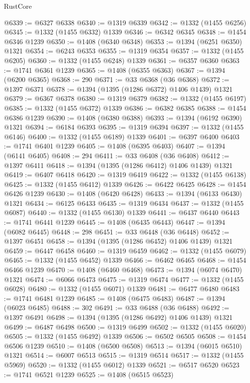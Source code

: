 \begin{lexlean}{RustCore}
\begin{coremodule}
@6339 := @6327 @6338
@6340 := @1319 @6339
@6342 := @1332 (@1455 @6256)
@6345 := @1332 (@1455 @6332) @1339
@6346 := @6342 @6345
@6348 := @1454 @6346 @1239
@6350 := @1408 (@6340 @6348)
@6353 := @1394 (@6251 @6350) @1321
@6354 := @6243 @6353
@6355 := @1319 @6354
@6357 := @1332 (@1455 @6205)
@6360 := @1332 (@1455 @6248) @1339
@6361 := @6357 @6360
@6363 := @1741 @6361 @1239
@6365 := @1408 (@6355 @6363)
@6367 := @1394 (@6200 @6365)
@6368 := 290
@6371 := @33 @6368 (@36 @6368)
@6372 := @1397 @6371
@6378 := @1394 (@1395 (@1286 @6372) @1406 @1439) @1321
@6379 := @6367 @6378
@6380 := @1319 @6379
@6382 := @1332 (@1455 @6197)
@6385 := @1332 (@1455 @6372) @1339
@6386 := @6382 @6385
@6388 := @1454 @6386 @1239
@6390 := @1408 (@6380 @6388)
@6393 := @1394 (@6192 @6390) @1321
@6394 := @6184 @6393
@6395 := @1319 @6394
@6397 := @1332 (@1455 @6146)
@6400 := @1332 (@1455 @6189) @1339
@6401 := @6397 @6400
@6403 := @1741 @6401 @1239
@6405 := @1408 (@6395 @6403)
@6407 := @1394 (@6141 @6405)
@6408 := 294
@6411 := @33 @6408 (@36 @6408)
@6412 := @1397 @6411
@6418 := @1394 (@1395 (@1286 @6412) @1406 @1439) @1321
@6419 := @6407 @6418
@6420 := @1319 @6419
@6422 := @1332 (@1455 @6138)
@6425 := @1332 (@1455 @6412) @1339
@6426 := @6422 @6425
@6428 := @1454 @6426 @1239
@6430 := @1408 (@6420 @6428)
@6433 := @1394 (@6133 @6430) @1321
@6434 := @6125 @6433
@6435 := @1319 @6434
@6437 := @1332 (@1455 @6087)
@6440 := @1332 (@1455 @6130) @1339
@6441 := @6437 @6440
@6443 := @1741 @6441 @1239
@6445 := @1408 (@6435 @6443)
@6447 := @1394 (@6082 @6445)
@6448 := 298
@6451 := @33 @6448 (@36 @6448)
@6452 := @1397 @6451
@6458 := @1394 (@1395 (@1286 @6452) @1406 @1439) @1321
@6459 := @6447 @6458
@6460 := @1319 @6459
@6462 := @1332 (@1455 @6079)
@6465 := @1332 (@1455 @6452) @1339
@6466 := @6462 @6465
@6468 := @1454 @6466 @1239
@6470 := @1408 (@6460 @6468)
@6473 := @1394 (@6074 @6470) @1321
@6474 := @6066 @6473
@6475 := @1319 @6474
@6477 := @1332 (@1455 @6028)
@6480 := @1332 (@1455 @6071) @1339
@6481 := @6477 @6480
@6483 := @1741 @6481 @1239
@6485 := @1408 (@6475 @6483)
@6487 := @1394 (@6023 @6485)
@6488 := 302
@6491 := @33 @6488 (@36 @6488)
@6492 := @1397 @6491
@6498 := @1394 (@1395 (@1286 @6492) @1406 @1439) @1321
@6499 := @6487 @6498
@6500 := @1319 @6499
@6502 := @1332 (@1455 @6020)
@6505 := @1332 (@1455 @6492) @1339
@6506 := @6502 @6505
@6508 := @1454 @6506 @1239
@6510 := @1408 (@6500 @6508)
@6513 := @1394 (@6015 @6510) @1321
@6514 := @6007 @6513
@6515 := @1319 @6514
@6517 := @1332 (@1455 @5969)
@6520 := @1332 (@1455 @6012) @1339
@6521 := @6517 @6520
@6523 := @1741 @6521 @1239
@6525 := @1408 (@6515 @6523)

\end{coremodule}
\end{lexlean}
